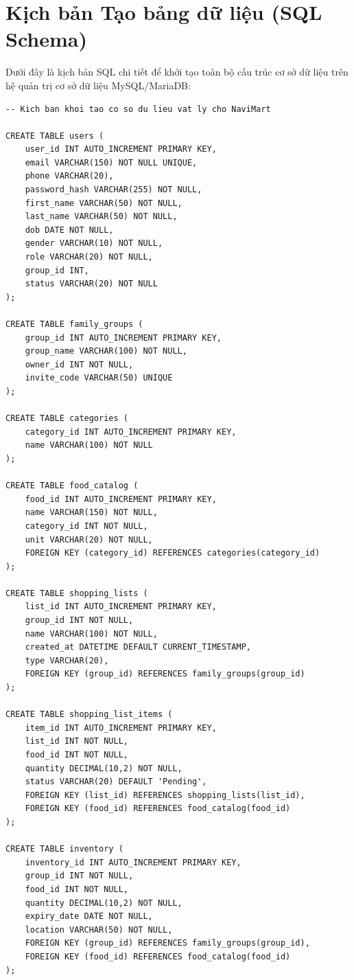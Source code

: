 \documentclass[12pt,a4paper]{article}
\begin{document}
\newpage
\section{Kịch bản Tạo bảng dữ liệu (SQL Schema)}
Dưới đây là kịch bản SQL chi tiết để khởi tạo toàn bộ cấu trúc cơ sở dữ liệu trên hệ quản trị cơ sở dữ liệu MySQL/MariaDB:

\begin{lstlisting}[caption=SQL Schema Definition for NaviMart]
-- Kich ban khoi tao co so du lieu vat ly cho NaviMart

CREATE TABLE users (
    user_id INT AUTO_INCREMENT PRIMARY KEY,
    email VARCHAR(150) NOT NULL UNIQUE,
    phone VARCHAR(20),
    password_hash VARCHAR(255) NOT NULL,
    first_name VARCHAR(50) NOT NULL,
    last_name VARCHAR(50) NOT NULL,
    dob DATE NOT NULL,
    gender VARCHAR(10) NOT NULL,
    role VARCHAR(20) NOT NULL,
    group_id INT,
    status VARCHAR(20) NOT NULL
);

CREATE TABLE family_groups (
    group_id INT AUTO_INCREMENT PRIMARY KEY,
    group_name VARCHAR(100) NOT NULL,
    owner_id INT NOT NULL,
    invite_code VARCHAR(50) UNIQUE
);

CREATE TABLE categories (
    category_id INT AUTO_INCREMENT PRIMARY KEY,
    name VARCHAR(100) NOT NULL
);

CREATE TABLE food_catalog (
    food_id INT AUTO_INCREMENT PRIMARY KEY,
    name VARCHAR(150) NOT NULL,
    category_id INT NOT NULL,
    unit VARCHAR(20) NOT NULL,
    FOREIGN KEY (category_id) REFERENCES categories(category_id)
);

CREATE TABLE shopping_lists (
    list_id INT AUTO_INCREMENT PRIMARY KEY,
    group_id INT NOT NULL,
    name VARCHAR(100) NOT NULL,
    created_at DATETIME DEFAULT CURRENT_TIMESTAMP,
    type VARCHAR(20),
    FOREIGN KEY (group_id) REFERENCES family_groups(group_id)
);

CREATE TABLE shopping_list_items (
    item_id INT AUTO_INCREMENT PRIMARY KEY,
    list_id INT NOT NULL,
    food_id INT NOT NULL,
    quantity DECIMAL(10,2) NOT NULL,
    status VARCHAR(20) DEFAULT 'Pending',
    FOREIGN KEY (list_id) REFERENCES shopping_lists(list_id),
    FOREIGN KEY (food_id) REFERENCES food_catalog(food_id)
);

CREATE TABLE inventory (
    inventory_id INT AUTO_INCREMENT PRIMARY KEY,
    group_id INT NOT NULL,
    food_id INT NOT NULL,
    quantity DECIMAL(10,2) NOT NULL,
    expiry_date DATE NOT NULL,
    location VARCHAR(50) NOT NULL,
    FOREIGN KEY (group_id) REFERENCES family_groups(group_id),
    FOREIGN KEY (food_id) REFERENCES food_catalog(food_id)
);


\end{lstlisting}
\end{document}

